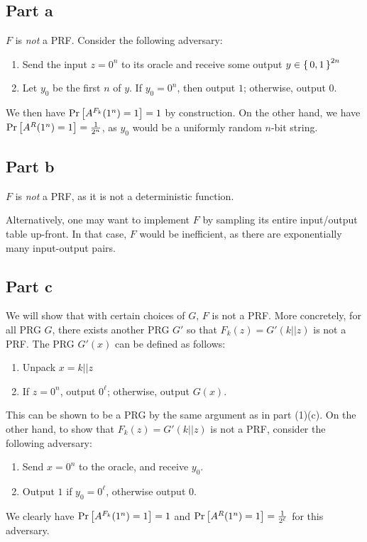 \documentclass{article}
\theoremstyle{definition}
\begin{document}
\subsection*{Part a}

$F$ is \emph{not} a PRF.
Consider the following adversary:
\begin{enumerate}
    \item Send the input $z=0^n$ to its oracle and receive some output $y\in\set{0, 1}^{2n}$
    \item Let $y_0$ be the first $n$ of $y$.
    If $y_0=0^n$, then output $1$;
    otherwise, output $0$.
\end{enumerate}
We then have
$\Pr\left[A^{F_k}(1^n)=1\right]=1$
by construction.
On the other hand, we have
$\Pr\left[A^{R}(1^n)=1\right]=\frac{1}{2^n}$,
as $y_0$ would be a uniformly random $n$-bit string.

\subsection*{Part b}

$F$ is \emph{not} a PRF, as it is not a deterministic function.

Alternatively, one may want to implement $F$ by sampling its entire input/output table up-front.
In that case, $F$ would be inefficient, as there are exponentially many input-output pairs.

\subsection*{Part c}

We will show that with certain choices of $G$, $F$ is not a PRF.
More concretely, for all PRG $G$, there exists another PRG $G'$ so that $F_k(z)=G'(k || z)$ is not a PRF.
The PRG $G'(x)$ can be defined as follows:
\begin{enumerate}
    \item Unpack $x = k || z$
    \item If $z = 0^n$, output $0^\ell$; otherwise, output $G(x)$.
\end{enumerate}

This can be shown to be a PRG by the same argument as in part (1)(c).
On the other hand, to show that $F_k(z)=G'(k || z)$ is not a PRF, consider the following adversary: \begin{enumerate}
    \item Send $x=0^n$ to the oracle, and receive $y_0$.
    \item Output $1$ if $y_0=0^\ell$, otherwise output $0$.
\end{enumerate}
We clearly have $\Pr\left[A^{F_k}(1^n)=1\right]=1$ and $\Pr\left[A^R(1^n)=1\right]=\frac{1}{2^\ell}$ for this adversary.
\end{document}
